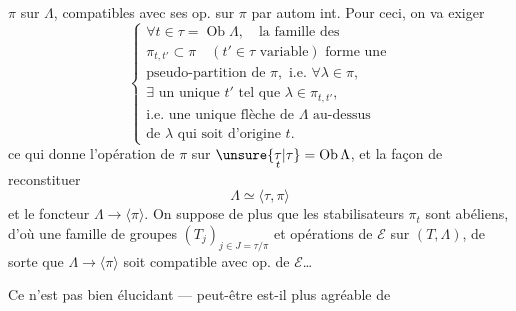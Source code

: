 $\pi$ sur $\Lambda$, compatibles avec ses op. sur $\pi$ par autom int. Pour ceci, on va exiger
\[
\left\{\begin{gathered}
\forall t\in\tau=\operatorname{Ob}\Lambda,\quad\text{la famille des}\\
\pi_{t,t'}\subset\pi\quad(t'\in\tau\text{ variable})\text{ forme une}\\
\text{pseudo-partition de }\pi,\text{ i.e. }\forall\lambda\in\pi,\\
\exists\text{ un unique }t'\text{ tel que }\lambda\in\pi_{t,t'},\\
\text{i.e. une unique flèche de }\Lambda\text{ au-dessus}\\
\text{de }\lambda\text{ qui soit d'origine }t.
\end{gathered}\right.
\]
ce qui donne l'opération de $\pi$ sur $\unsure{\underset{t}{\tau}|\tau}=\operatorname{Ob}\Lambda$, et la façon de reconstituer
\[
\Lambda\simeq\langle\tau,\pi\rangle
\]
et le foncteur $\Lambda\longrightarrow\langle\pi\rangle$.  On  suppose de plus que les stabilisateurs $\pi_t$ sont abéliens, d'où une famille de groupes $(T_j)_{j\in J=\tau/\pi}$ et opérations de $\mathcal E$ sur $(T,\Lambda)$, de sorte que $\Lambda\longrightarrow\langle\pi\rangle$ soit compatible avec op. de $\mathcal E$\ldots

Ce n'est pas bien élucidant --- peut-être est-il plus agréable de
